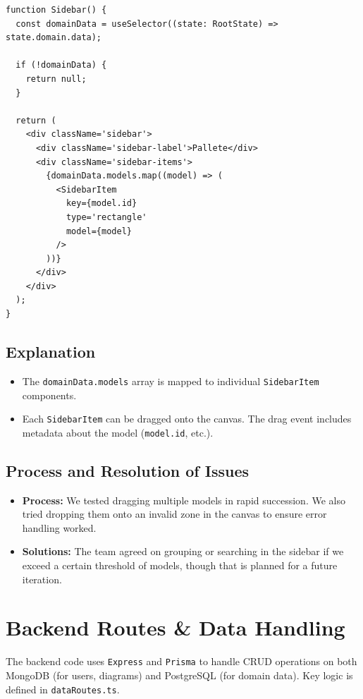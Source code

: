 \documentclass{article}
\begin{document}
\begin{verbatim}
function Sidebar() {
  const domainData = useSelector((state: RootState) => state.domain.data);

  if (!domainData) {
    return null;
  }

  return (
    <div className='sidebar'>
      <div className='sidebar-label'>Pallete</div>
      <div className='sidebar-items'>
        {domainData.models.map((model) => (
          <SidebarItem
            key={model.id}
            type='rectangle'
            model={model}
          />
        ))}
      </div>
    </div>
  );
}
\end{verbatim}

\subsection{Explanation}
\begin{itemize}
  \item The \texttt{domainData.models} array is mapped to individual \texttt{SidebarItem} components.
  \item Each \texttt{SidebarItem} can be dragged onto the canvas. The drag event includes metadata about the model (\texttt{model.id}, etc.).
\end{itemize}

\subsection{Process and Resolution of Issues}
\begin{itemize}
  \item \textbf{Process:} We tested dragging multiple models in rapid succession. We also tried dropping them onto an invalid zone in the canvas to ensure error handling worked.
  \item \textbf{Solutions:} The team agreed on grouping or searching in the sidebar if we exceed a certain threshold of models, though that is planned for a future iteration.
\end{itemize}

\section{Backend Routes \& Data Handling}

The backend code uses \texttt{Express} and \texttt{Prisma} to handle CRUD operations on both MongoDB (for users, diagrams) and PostgreSQL (for domain data). Key logic is defined in \texttt{dataRoutes.ts}.
\end{document}
